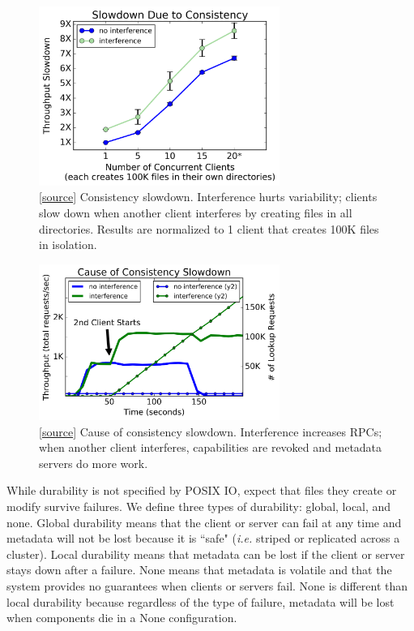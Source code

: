 \begin{figure}[tb]
  \centering
  \includegraphics[width=0.7\textwidth]{./chapters/cudele/figures/slowdown-interfere-scale.png}
  \caption{[\href{https://github.com/michaelsevilla/cudele-popper/blob/master/experiments/baseline-creates/visualize/viz.ipynb}{source}]
  Consistency slowdown. Interference hurts variability; clients slow down when another client
  interferes by creating files in all directories.  Results are normalized to 1
  client that creates 100K files in isolation.}
  \label{fig:overhead-b}
\end{figure}

\begin{figure}[tb]
  \centering
  \includegraphics[width=0.7\textwidth]{./chapters/cudele/figures/behavior-interfere.png}
  \caption{[\href{https://github.com/michaelsevilla/cudele-popper/blob/master/experiments/baseline-interfere/visualize/viz.ipynb}{source}]
  Cause of consistency slowdown. Interference increases RPCs; when another
  client interferes, capabilities are revoked and metadata servers do more work.}
  \label{fig:overhead-c}
\end{figure}

While durability is not specified by POSIX IO,
 expect that files they create or
modify survive failures.  We define three types of durability: global, local,
and none.  Global durability means that the client or server can fail at any
time and metadata will not be lost because it is ``safe" ({\it i.e.} striped or
replicated across a cluster). Local durability means that metadata can be lost
if the client or server stays down after a failure. None means that metadata is
volatile and that the system provides no guarantees when clients or servers
fail.  None is different than local durability because regardless of the type
of failure, metadata will be lost when components die in a None configuration.

